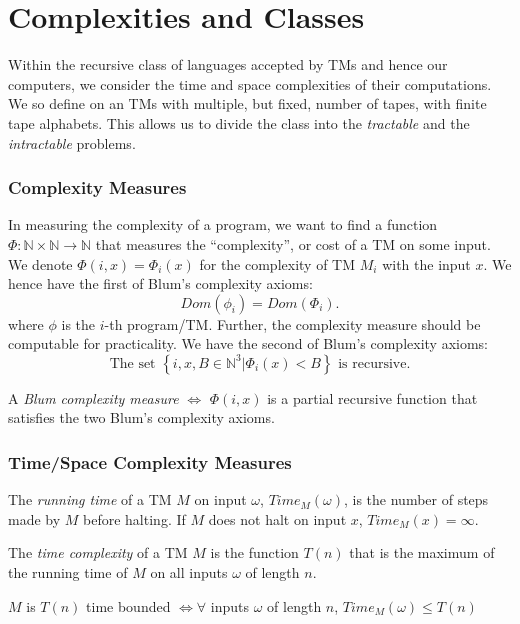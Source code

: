\section{Complexities and Classes}
Within the recursive class of languages accepted by TMs and hence our
computers, we consider the time and space complexities of their computations.
We so define on an TMs with multiple, but fixed, number of tapes, with finite
tape alphabets. This allows us to divide the class into the \textit{tractable}
and the \textit{intractable} problems.

\subsubsection{Complexity Measures}
In measuring the complexity of a program, we want to find a function $\Phi:
\mathbb{N}\times \mathbb{N}\to \mathbb{N}$ that measures the ``complexity'', or
cost of a TM on some input. We denote $\Phi\left( i,x \right)=\Phi_i\left( x
\right)$ for the complexity of TM $M_i$ with the input $x$. We hence have the
first of Blum's complexity axioms:
\[Dom\left( \phi_i \right)=Dom\left( \Phi_i \right).\]
where $\phi$ is the $i$-th program/TM.  Further, the complexity measure should
be computable for practicality. We have the second of Blum's complexity axioms:
\[\text{The set }\left\{ i,x,B  \in \mathbb{N}^{3}|\Phi_i\left( x \right)
<B\right\}\text{ is recursive}.\]

\begin{definition}
  A \textit{Blum complexity measure} $\iff$ $\Phi\left( i,x \right) $ is a
  partial recursive function that satisfies the two Blum's complexity axioms.
\end{definition}

\subsubsection{Time/Space Complexity Measures}

\begin{definition}
  The \textit{running time} of a TM $M$ on input $\omega$, $Time_M\left(
  \omega \right)$, is the number of steps made by $M$ before halting. If $M$
  does not halt on input $x$, $Time_M\left( x \right) =\infty$.
\end{definition}

\begin{definition}
  The \textit{time complexity} of a TM $M$ is the function $T(n)$ that is
  the maximum of the running time of $M$ on  all inputs $\omega$
  of length $n$.
  \begin{center}
    $M$ is $T(n)$ time bounded $\iff\forall$ inputs $\omega$ of length $n$,
    $Time_M\left( \omega \right) \le T(n)$
  \end{center}
\end{definition}

